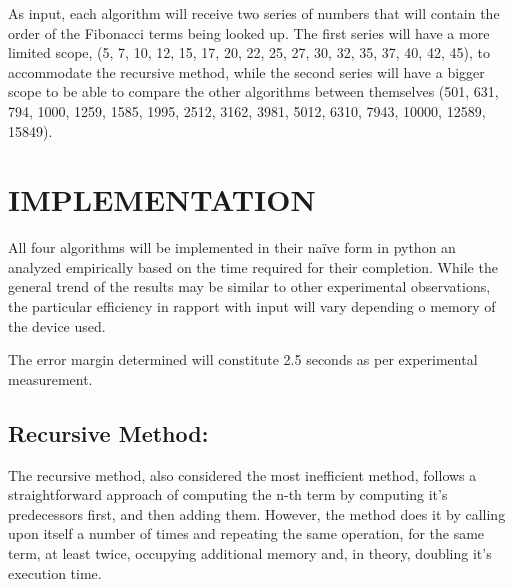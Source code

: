 \documentclass[12pt]{article}
\begin{document}
\hspace{0.8cm} As input, each algorithm will receive two series of numbers that will contain the order of the 
Fibonacci terms being looked up. The first series will have a more limited scope, (5, 7, 10, 12, 15, 17, 20, 
22, 25, 27, 30, 32, 35, 37, 40, 42, 45), to accommodate the recursive method, while the second series will 
have a bigger scope to be able to compare the other algorithms between themselves (501, 631, 794, 1000, 
1259, 1585, 1995, 2512, 3162, 3981, 5012, 6310, 7943, 10000, 12589, 15849).



\section*{IMPLEMENTATION}

\hspace{0.8cm} All four algorithms will be implemented in their naïve form in python an analyzed empirically 
based on the time required for their completion. While the general trend of the results may be similar to 
other experimental observations, the particular efficiency in rapport with input will vary depending o 
memory of the device used. 

The error margin determined will constitute 2.5 seconds as per experimental measurement. 

\subsection*{Recursive Method:}

\hspace{0.8cm} The recursive method, also considered the most inefficient method, follows a straightforward 
approach of computing the n-th term by computing it’s predecessors first, and then adding them. 
However, the method does it by calling upon itself a number of times and repeating the same operation, 
for the same term, at least twice, occupying additional memory and, in theory, doubling it’s execution 
time. 
\end{document}
